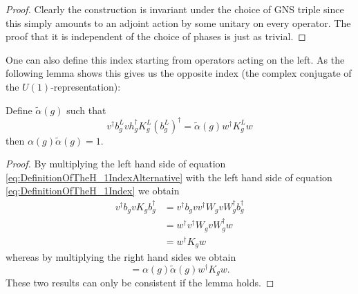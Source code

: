 \documentclass[12pt,a4paper,twoside]{article}
\numberwithin{equation}{section}
\begin{document}
\begin{proof}
	Clearly the construction is invariant under the choice of GNS triple since this simply amounts to an adjoint action by some unitary on every operator. The proof that it is independent of the choice of phases is just as trivial.
\end{proof}
One can also define this index starting from operators acting on the left. As the following lemma shows this gives us the opposite index (the complex conjugate of the $U(1)$-representation):
\begin{lemma}
	Define $\tilde{\alpha}(g)$ such that
	\begin{equation}\label{eq:DefinitionOfTheH_1IndexAlternative}
		v^\dagger b_g^L v h_g^\dagger K_g^L (b_g^L)^\dagger=\tilde{\alpha}(g)w^\dagger K_g^L w
	\end{equation}
	then $\alpha(g)\tilde{\alpha}(g)=1$.
\end{lemma}
\begin{proof}
	By multiplying the left hand side of equation \eqref{eq:DefinitionOfTheH_1IndexAlternative} with the left hand side of equation \eqref{eq:DefinitionOfTheH_1Index} we obtain
	\begin{align}
		v^\dagger b_g v K_g b_g^\dagger&=v^\dagger b_g v v^\dagger W_g v W_g^\dagger b_g^\dagger\\
		&=w^\dagger v^\dagger W_g v W_g^\dagger w\\
		&=w^\dagger K_g w
	\end{align}
	whereas by multiplying the right hand sides we obtain
	\begin{equation}
		=\alpha(g)\tilde{\alpha}(g)w^\dagger K_g w.
	\end{equation}
	These two results can only be consistent if the lemma holds.
\end{proof}
\end{document}
